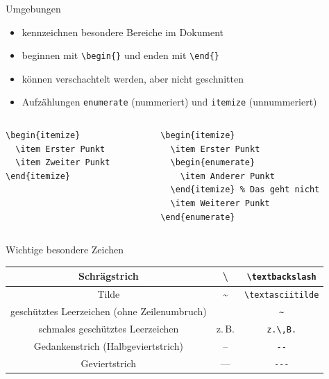 \documentclass[presentation,aspectratio=169]{beamer}
\begin{document}
\begin{frame}[fragile]{Umgebungen}
  \begin{itemize}
    \item kennzeichnen besondere Bereiche im Dokument
    \item beginnen mit \verb|\begin{}| und enden mit \verb|\end{}|
    \item können verschachtelt werden, aber nicht geschnitten
    \item Aufzählungen \verb|enumerate| (nummeriert) und \verb|itemize| (unnummeriert)
  \end{itemize}
  \begin{columns}[t]
    \begin{column}{.3\textwidth}
      \centering
      \begin{verbatim}
\begin{itemize}
  \item Erster Punkt
  \item Zweiter Punkt
\end{itemize}
      \end{verbatim}
    \end{column}
    \begin{column}{.5\textwidth}
      \centering
      \begin{verbatim}
\begin{itemize}
  \item Erster Punkt
  \begin{enumerate}
    \item Anderer Punkt
  \end{itemize} % Das geht nicht
  \item Weiterer Punkt
\end{enumerate}
      \end{verbatim}
    \end{column}
  \end{columns}
\end{frame}

\begin{frame}[fragile]{Wichtige besondere Zeichen}
  \begin{tabular}{c|c|c}
    Schrägstrich                                  & \textbackslash   & \verb|\textbackslash| \\
    \hline
    Tilde                                         & \textasciitilde  & \verb|\textasciitilde| \\
    \hline
    geschütztes Leerzeichen (ohne Zeilenumbruch)  & ~                & \verb|~| \\
    \hline
    schmales geschütztes Leerzeichen              & z.\,B.           & \verb|z.\,B.| \\
    \hline
    Gedankenstrich (Halbgeviertstrich)            & --               & \verb|--| \\
    \hline
    Geviertstrich                                 & ---              & \verb|---|
  \end{tabular}
\end{frame}
\end{document}
